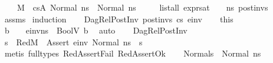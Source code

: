 \begin{isabellebody}
\ \ \ \ {\isacharparenleft}{\kern0pt}M{\isacharcomma}{\kern0pt}{\isasymLambda}{\isacharcomma}{\kern0pt}{\isasymGamma}{\isacharcomma}{\kern0pt}{\isasymOmega}\ {\isasymturnstile}\ {\isasymlangle}cs{}A{\isacharcomma}{\kern0pt}\ Normal\ ns{\isasymrangle}\ {\isacharbrackleft}{\kern0pt}{\isasymrightarrow}{\isacharbrackright}{\kern0pt}\ Normal\ ns{\isacharparenright}{\kern0pt}\ {\isasymand}\isanewline
\ \ \ \ list{\isacharunderscore}{\kern0pt}all\ {\isacharparenleft}{\kern0pt}expr{\isacharunderscore}{\kern0pt}sat\ {\isasymLambda}\ {\isasymGamma}\ {\isasymOmega}\ ns{\isacharparenright}{\kern0pt}\ post{\isacharunderscore}{\kern0pt}invs{\isachardoublequoteclose}\isanewline
%
\isadelimproof
\ \ %
\endisadelimproof
%
\isatagproof
{}\isamarkupfalse%
\ assms\isanewline
{}\isamarkupfalse%
\ induction\isanewline
\ \ \isamarkupfalse%
\ {\isacharparenleft}{\kern0pt}DagRel{\isacharunderscore}{\kern0pt}PostInv\ post{\isacharunderscore}{\kern0pt}invs\ cs{}\ e{\isacharunderscore}{\kern0pt}inv{\isacharparenright}{\kern0pt}\isanewline
\ \ \isamarkupfalse%
\ this\ \isamarkupfalse%
\ b\ \ {\isachardoublequoteopen}{\isasymLambda}{\isacharcomma}{\kern0pt}{\isasymGamma}{\isacharcomma}{\kern0pt}{\isasymOmega}\ {\isasymturnstile}\ {\isasymlangle}e{\isacharunderscore}{\kern0pt}inv{\isacharcomma}{\kern0pt}ns{\isasymrangle}\ {\isasymDown}\ {\isacharparenleft}{\kern0pt}BoolV\ b{\isacharparenright}{\kern0pt}{\isachardoublequoteclose}\ \isamarkupfalse%
\ auto\isanewline
\ \ \isamarkupfalse%
\ DagRel{\isacharunderscore}{\kern0pt}PostInv\ \isamarkupfalse%
\ s{\isacharprime}{\kern0pt}{\isacharprime}{\kern0pt}\ \ Red{}{\isacharcolon}{\kern0pt}{\isachardoublequoteopen}M{\isacharcomma}{\kern0pt}{\isasymLambda}{\isacharcomma}{\kern0pt}{\isasymGamma}{\isacharcomma}{\kern0pt}{\isasymOmega}\ {\isasymturnstile}\ {\isasymlangle}Assert\ e{\isacharunderscore}{\kern0pt}inv{\isacharcomma}{\kern0pt}\ Normal\ ns{\isasymrangle}\ {\isasymrightarrow}\ s{\isacharprime}{\kern0pt}{\isacharprime}{\kern0pt}{\isachardoublequoteclose}\isanewline
\ \ \ \ \isamarkupfalse%
\ {\isacharparenleft}{\kern0pt}metis\ {\isacharparenleft}{\kern0pt}full{\isacharunderscore}{\kern0pt}types{\isacharparenright}{\kern0pt}\ RedAssertFail\ RedAssertOk{\isacharparenright}{\kern0pt}\isanewline
\ \ \isamarkupfalse%
\ Normal{\isacharcolon}{\kern0pt}{\isachardoublequoteopen}s{\isacharprime}{\kern0pt}{\isacharprime}{\kern0pt}\ {\isacharequal}{\kern0pt}\ Normal\ ns{\isachardoublequoteclose}\ \isamarkupfalse%

\end{isabellebody}

